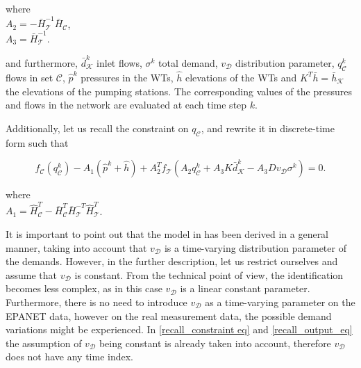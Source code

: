 \vspace{-1mm}

\begin{minipage}[t]{0.4\textwidth}
where\\
\hspace*{8mm} $A_2 = -\bar{H}^{-1}_{\mathcal{T}} \bar{H}_{\mathcal{C}} $, \vspace*{1.5mm}\\
\hspace*{8mm} $A_3 = \bar{H}^{-1}_{\mathcal{T}}$.
\end{minipage}

and furthermore, $\bar{d}^{k}_{\mathcal{K}}$ inlet flows, $\sigma^{k}$ total demand, $v_{\mathcal{D}}$ distribution parameter, $q^{k}_{\mathcal{C}}$ flows in set $\mathcal{C}$, $\hat{p}^{k}$ pressures in the WTs, $\hat{h}$ elevations of the WTs and $K^T\bar{h} = \bar{h}_{\mathcal{K}} $ the elevations of the pumping stations. The corresponding values of the pressures and flows in the network are evaluated at each time step $k$. 

Additionally, let us recall the constraint on $q_\mathcal{C}$, and rewrite it in discrete-time form such that

 \begin{equation}
\label{recall_constraint eq}
f_{\mathcal{C}}(q^{k}_{\mathcal{C}}) - A_1(\hat{p}^{k} + \hat{h}) + A_2^T f_{\mathcal{T}}(A_2 q^{k}_{\mathcal{C}} + A_3 K \bar{d}^{k}_{\mathcal{K}} - A_3 D v_{\mathcal{D}} \sigma^{k}) = 0.
\end{equation} 

\vspace{-1mm}

\begin{minipage}[t]{0.4\textwidth}
where\\
\hspace*{8mm} $A_1 = \hat{H}^T_{\mathcal{C}} -\bar{H}^T_{\mathcal{C}}\bar{H}^{-T}_{\mathcal{T}}\hat{H}^T_{\mathcal{T}}$. 
\end{minipage}

It is important to point out that the model in  has been derived in a general manner, taking into account that $v_{\mathcal{D}}$ is a time-varying distribution parameter of the demands. However, in the further description, let us restrict ourselves and assume that $v_{\mathcal{D}}$ is constant.  From the technical point of view, the identification becomes less complex, as in this case $v_{\mathcal{D}}$ is a linear constant parameter. Furthermore, there is no need to introduce $v_{\mathcal{D}}$ as a time-varying parameter on the EPANET data, however on the real measurement data, the possible demand variations might be experienced. In \eqref{recall_constraint eq} and \eqref{recall_output_eq} the assumption of $v_{\mathcal{D}}$ being constant is already taken into account, therefore $v_{\mathcal{D}}$ does not have any time index.

